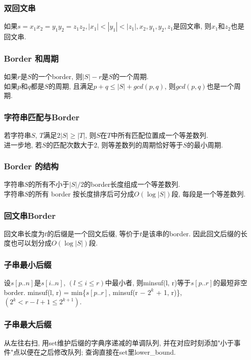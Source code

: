 \subsubsection{双回文串}
\noindent
如果$s=x_1x_2=y_1y_2=z_1z_2, |x_1|<|y_1|<|z_1|, x_2, y_1, y_2, z_1$是回文串, 则$x_1$和$z_2$也是回文串. 

\subsubsection{Border 和周期}
\noindent
如果$r$是$S$的一个border, 则$|S|-r$是$S$的一个周期.\\
如果$p$和$q$都是$S$的周期, 且满足$p+q\le |S|+gcd(p,q)$, 则$gcd(p,q)$也是一个周期.

\subsubsection{字符串匹配与Border}
\noindent
若字符串$S$, $T$满足$2|S|\ge |T|$, 则$S$在$T$中所有匹配位置成一个等差数列.\\
进一步地, 若$S$的匹配次数大于2, 则等差数列的周期恰好等于$S$的最小周期.

\subsubsection{Border 的结构}
\noindent
字符串$S$的所有不小于$|S|/2$的border长度组成一个等差数列.\\
字符串$S$的所有 border 按长度排序后可分成$O(\log{|S|})$段, 每段是一个等差数列. 

\subsubsection{回文串Border}
\noindent
回文串长度为$t$的后缀是一个回文后缀, 等价于$t$是该串的border. 因此回文后缀的长度也可以划分成$O(\log{|S|})$段.

\subsubsection{子串最小后缀}
\noindent
设$s[p..n]$是$s[i..n]$, $(l \leq i \leq r)$中最小者, 则minsuf(l, r)等于$s[p..r]$的最短非空 border. minsuf(l, r) = min\{$s[p..r]$, minsuf(r − $2^k$ + 1, r)\}, $(2^k < r − l + 1 \leq 2^{k+1})$. 

\subsubsection{子串最大后缀}
\noindent
从左往右扫, 用set维护后缀的字典序递减的单调队列, 并在对应时刻添加"小于事件"点以便在之后修改队列; 查询直接在set里lower\_bound. 